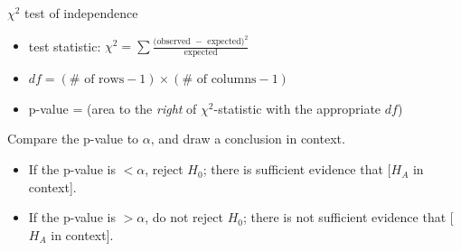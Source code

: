 \begin{onebox}{$\chi^2$ test of independence}
\begin{itemize}
\setlength{\itemsep}{0mm}
\item[] test statistic:  $\chi^2 =\sum{ \frac{\text{(observed } - \text{ expected})^2}{\text{expected}}}$ 
\item[] $df = (\# \text{ of rows} - 1) \times (\# \text{ of columns} - 1)$
\item[] p-value = (area to the \emph{right} of $\chi^2$-statistic with the appropriate $df$)
\end{itemize}
 Compare the p-value to $\alpha$, and draw a conclusion in context.
\begin{itemize}\vspace{-1mm}
\setlength{\itemsep}{0mm}
\item[] If the p-value is $< \alpha$, reject $H_0$; there is sufficient evidence that [$H_A$ in context]. 
\item[] If the p-value is $> \alpha$, do not reject $H_0$; there is not sufficient evidence that [$H_A$ in context].
\end{itemize}\end{onebox}



